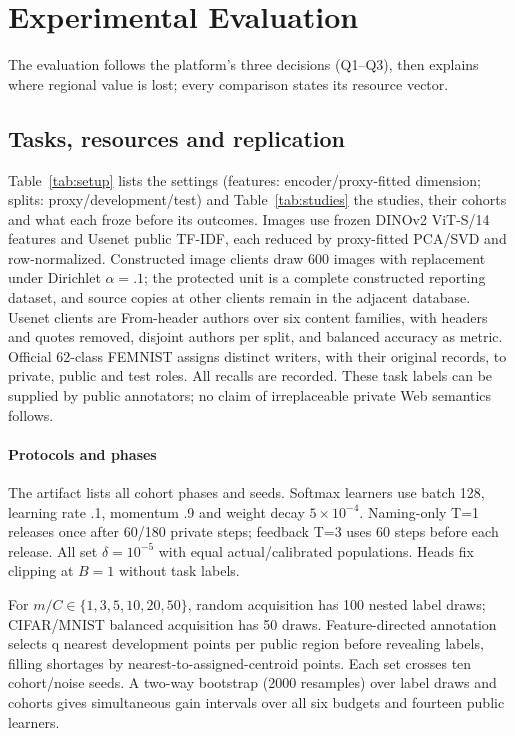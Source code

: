 \section{Experimental Evaluation}
\label{sec:eval}

The evaluation follows the platform's three decisions (Q1--Q3), then
explains where regional value is lost; every comparison states its resource
vector.

\subsection{Tasks, resources and replication}
\label{sec:eval:setup}



Table~\ref{tab:setup} lists the settings (features: encoder/proxy-fitted
dimension; splits: proxy/development/test) and Table~\ref{tab:studies} the
studies, their cohorts and what each froze before its outcomes. Images use frozen DINOv2
ViT-S/14 features \cite{oquab2023dinov2} and Usenet public TF-IDF, each
reduced by proxy-fitted PCA/SVD and row-normalized. Constructed image
clients draw 600 images with replacement under Dirichlet $\alpha=.1$; the
protected unit is a complete constructed reporting dataset, and source copies
at other clients remain in the adjacent database. Usenet clients are
From-header authors over six content families, with headers and quotes
removed, disjoint authors per split, and balanced accuracy as metric.
Official 62-class FEMNIST \cite{caldas2018leaf,tff2024emnist} assigns
distinct writers, with their original records, to private, public and test
roles. All recalls are recorded. These task labels can be supplied by public
annotators; no claim of irreplaceable private Web semantics follows.

\paragraph{Protocols and phases}
The artifact lists all cohort phases and seeds. Softmax learners use
batch 128, learning rate .1, momentum .9 and weight decay $5\times10^{-4}$.
Naming-only T=1 releases once after 60/180 private steps; feedback T=3
uses 60 steps before each release. All set $\delta=10^{-5}$ with equal
actual/calibrated populations. Heads fix clipping at $B=1$ without task
labels.

For $m/C\in\{1,3,5,10,20,50\}$, random acquisition has 100 nested label
draws; CIFAR/MNIST balanced acquisition has 50 draws. Feature-directed
annotation selects q nearest development points per public region before
revealing labels, filling shortages by nearest-to-assigned-centroid points.
Each set crosses ten cohort/noise seeds. A two-way bootstrap (2000
resamples) over label draws and cohorts gives simultaneous gain
intervals over all six budgets and fourteen public learners.

